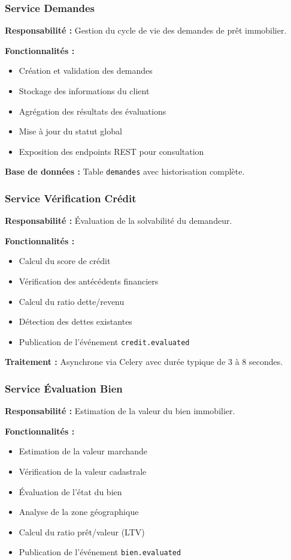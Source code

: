 \documentclass[12pt,a4paper]{article}
\begin{document}
\subsubsection{Service Demandes}

\textbf{Responsabilité :} Gestion du cycle de vie des demandes de prêt immobilier.

\textbf{Fonctionnalités :}
\begin{itemize}
    \item Création et validation des demandes
    \item Stockage des informations du client
    \item Agrégation des résultats des évaluations
    \item Mise à jour du statut global
    \item Exposition des endpoints REST pour consultation
\end{itemize}

\textbf{Base de données :} Table \texttt{demandes} avec historisation complète.

\subsubsection{Service Vérification Crédit}

\textbf{Responsabilité :} Évaluation de la solvabilité du demandeur.

\textbf{Fonctionnalités :}
\begin{itemize}
    \item Calcul du score de crédit
    \item Vérification des antécédents financiers
    \item Calcul du ratio dette/revenu
    \item Détection des dettes existantes
    \item Publication de l'événement \texttt{credit.evaluated}
\end{itemize}

\textbf{Traitement :} Asynchrone via Celery avec durée typique de 3 à 8 secondes.

\subsubsection{Service Évaluation Bien}

\textbf{Responsabilité :} Estimation de la valeur du bien immobilier.

\textbf{Fonctionnalités :}
\begin{itemize}
    \item Estimation de la valeur marchande
    \item Vérification de la valeur cadastrale
    \item Évaluation de l'état du bien
    \item Analyse de la zone géographique
    \item Calcul du ratio prêt/valeur (LTV)
    \item Publication de l'événement \texttt{bien.evaluated}
\end{itemize}
\end{document}
